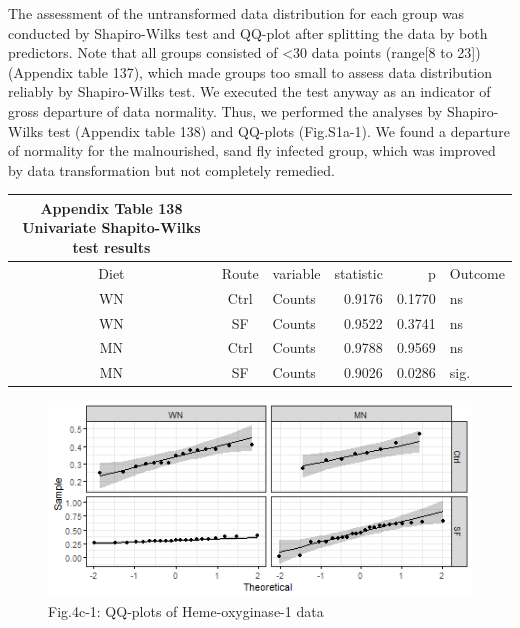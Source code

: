 \documentclass[
  12pt,
  letterpaper,
]{article}
\begin{document}
The assessment of the untransformed data distribution for each group was conducted by Shapiro-Wilks test and QQ-plot after splitting the data by both predictors. Note that all groups consisted of \textless30 data points (range{[}8 to 23{]}) (Appendix table 137), which made groups too small to assess data distribution reliably by Shapiro-Wilks test. We executed the test anyway as an indicator of gross departure of data normality. Thus, we performed the analyses by Shapiro-Wilks test (Appendix table 138) and QQ-plots (Fig.S1a-1). We found a departure of normality for the malnourished, sand fly infected group, which was improved by data transformation but not completely remedied.

\begingroup
\fontsize{12.0pt}{14.4pt}\selectfont
\begin{longtable}{cclrrl}
\caption*{
{\large \textbf{Appendix Table 138}} \\ 
{\small \textbf{Univariate Shapito-Wilks test results}}
} \\ 
\toprule
{Diet} & {Route} & {variable} & {statistic} & {p} & {Outcome} \\ 
\midrule\addlinespace[2.5pt]
WN & Ctrl & Counts & 0.9176 & 0.1770 & ns \\ 
WN & SF & Counts & 0.9522 & 0.3741 & ns \\ 
MN & Ctrl & Counts & 0.9788 & 0.9569 & ns \\ 
MN & SF & Counts & 0.9026 & 0.0286 & sig. \\ 
\bottomrule
\end{longtable}
\endgroup

\begin{figure}[H]

{\centering \includegraphics[width=0.95\linewidth,]{Statistics_Report_files/figure-latex/qq-plot-figure-4c-1} 

}

\caption{Fig.4c-1: QQ-plots of Heme-oxyginase-1 data}\label{fig:qq-plot-figure-4c}
\end{figure}
\end{document}
